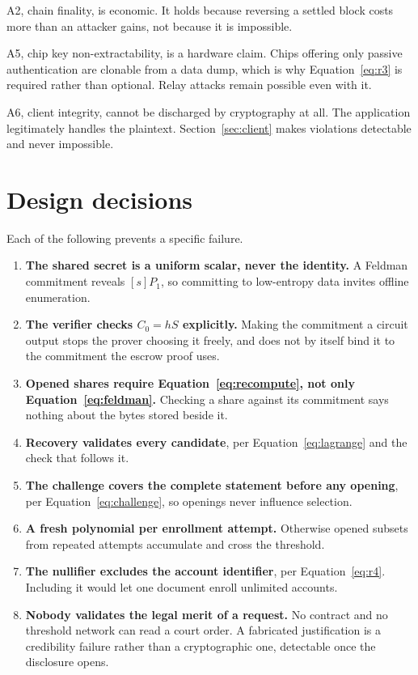 \documentclass[11pt,a4paper]{article}
\begin{document}
A2, chain finality, is economic. It holds because reversing a settled block costs
more than an attacker gains, not because it is impossible.

A5, chip key non-extractability, is a hardware claim. Chips offering only passive
authentication are clonable from a data dump, which is why Equation~\ref{eq:r3}
is required rather than optional. Relay attacks remain possible even with it.

A6, client integrity, cannot be discharged by cryptography at all. The
application legitimately handles the plaintext. Section~\ref{sec:client} makes
violations detectable and never impossible.

\section{Design decisions}

Each of the following prevents a specific failure.

\begin{enumerate}
  \item \textbf{The shared secret is a uniform scalar, never the identity.} A
        Feldman commitment reveals $[s]P_1$, so committing to low-entropy data
        invites offline enumeration.
  \item \textbf{The verifier checks $C_0 = hS$ explicitly.} Making the commitment
        a circuit output stops the prover choosing it freely, and does not by
        itself bind it to the commitment the escrow proof uses.
  \item \textbf{Opened shares require Equation~\ref{eq:recompute}, not only
        Equation~\ref{eq:feldman}.} Checking a share against its commitment says
        nothing about the bytes stored beside it.
  \item \textbf{Recovery validates every candidate}, per
        Equation~\ref{eq:lagrange} and the check that follows it.
  \item \textbf{The challenge covers the complete statement before any opening},
        per Equation~\ref{eq:challenge}, so openings never influence selection.
  \item \textbf{A fresh polynomial per enrollment attempt.} Otherwise opened
        subsets from repeated attempts accumulate and cross the threshold.
  \item \textbf{The nullifier excludes the account identifier}, per
        Equation~\ref{eq:r4}. Including it would let one document enroll
        unlimited accounts.
  \item \textbf{Nobody validates the legal merit of a request.} No contract and
        no threshold network can read a court order. A fabricated justification
        is a credibility failure rather than a cryptographic one, detectable once
        the disclosure opens.
\end{enumerate}
\end{document}
